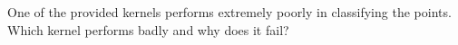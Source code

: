 \item {} 

One of the provided kernels performs
extremely poorly in classifying the points. Which kernel performs badly and why
does it fail?

